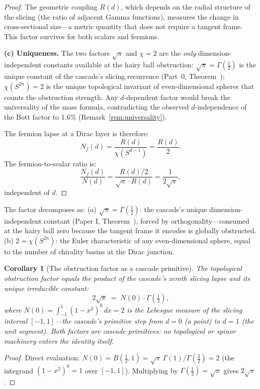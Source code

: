 \documentclass[12pt,a4paper]{article}
\newtheorem{corollary}[theorem]{Corollary}
\begin{document}
\begin{proof}
The geometric coupling $R(d)$, which depends on the radial structure of the
slicing (the ratio of adjacent Gamma functions), measures the change in
cross-sectional size---a metric quantity that does not require a tangent frame.
This factor survives for both scalars and fermions.

\medskip
\textbf{(c) Uniqueness.}
The two factors $\sqrt{\pi}$ and $\chi = 2$ are the \emph{only}
dimension-independent constants available at the hairy ball obstruction:
$\sqrt{\pi} = \Gamma(\tfrac{1}{2})$ is the unique constant of the cascade's
slicing recurrence (Part~0, Theorem~); $\chi(S^{2n}) = 2$ is the unique
topological invariant of even-dimensional spheres that counts the obstruction
strength. Any $d$-dependent factor would break the universality of the mass
formula, contradicting the observed $d$-independence of the Bott factor to
1.6\% (Remark~\ref{rem:universality}).

\medskip
The fermion lapse at a Dirac layer is therefore:
\[
N_f(d) = \frac{R(d)}{\chi(S^{d-1})} = \frac{R(d)}{2}.
\]
The fermion-to-scalar ratio is:
\[
\frac{N_f(d)}{N(d)} = \frac{R(d)/2}{\sqrt{\pi}\cdot R(d)} = \frac{1}{2\sqrt{\pi}},
\]
independent of $d$.
\end{proof}

\noindent The factor decomposes as: (a) $\sqrt{\pi} = \Gamma(\tfrac{1}{2})$: the cascade's unique dimension-independent constant (Paper I, Theorem~), forced by orthogonality---consumed at the hairy ball zero because the tangent frame it encodes is globally obstructed. (b) $2 = \chi(S^{2n})$: the Euler characteristic of any even-dimensional sphere, equal to the number of chirality basins at the Dirac junction.

\begin{corollary}[The obstruction factor as a cascade primitive]\label{cor:2sqrtpi-primitive}
The topological obstruction factor equals the product of the cascade's zeroth slicing lapse and its unique irreducible constant:
\[
2\sqrt{\pi} \;=\; N(0)\cdot\Gamma(\tfrac{1}{2}),
\]
where $N(0) = \int_{-1}^{1}(1-x^2)^0\,dx = 2$ is the Lebesgue measure of the slicing interval $[-1,1]$---the cascade's primitive step from $d=0$ (a point) to $d=1$ (the unit segment). Both factors are cascade primitives: no topological or spinor machinery enters the identity itself.
\end{corollary}

\begin{proof}
Direct evaluation: $N(0) = B(\tfrac{1}{2},1) = \sqrt{\pi}\,\Gamma(1)/\Gamma(\tfrac{3}{2}) = 2$ (the integrand $(1-x^2)^0 = 1$ over $[-1,1]$). Multiplying by $\Gamma(\tfrac{1}{2}) = \sqrt{\pi}$ gives $2\sqrt{\pi}$.
\end{proof}
\end{document}
